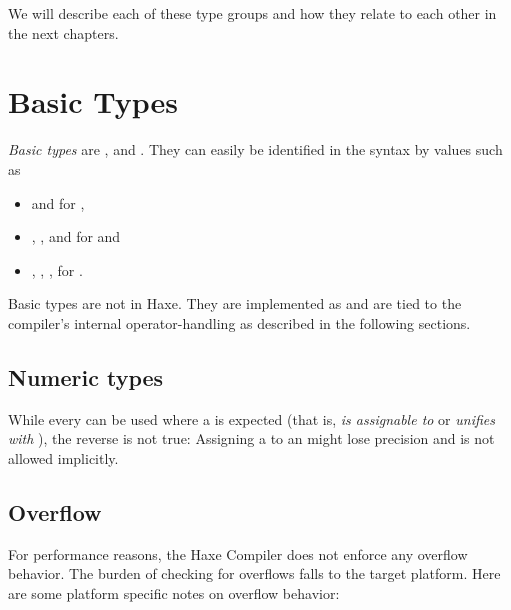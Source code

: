 We will describe each of these type groups and how they relate to each other in the next chapters.



\section{Basic Types}
\label{types-basic-types}

\emph{Basic types} are ,  and . They can easily be identified in the syntax by values such as

\begin{itemize}
	\item {} and  for ,
	\item {}, ,  and  for  and
	\item {}, , ,  for .
\end{itemize}

Basic types are not  in Haxe. They are implemented as  and are tied to the compiler's internal operator-handling as described in the following sections.

\subsection{Numeric types}
\label{types-numeric-types}


While every  can be used where a  is expected (that is,  \emph{is assignable to} or \emph{unifies with} ), the reverse is not true: Assigning a  to an  might lose precision and is not allowed implicitly.

\subsection{Overflow}
\label{types-overflow}

For performance reasons, the Haxe Compiler does not enforce any overflow behavior. The burden of checking for overflows falls to the target platform. Here are some platform specific notes on overflow behavior:

